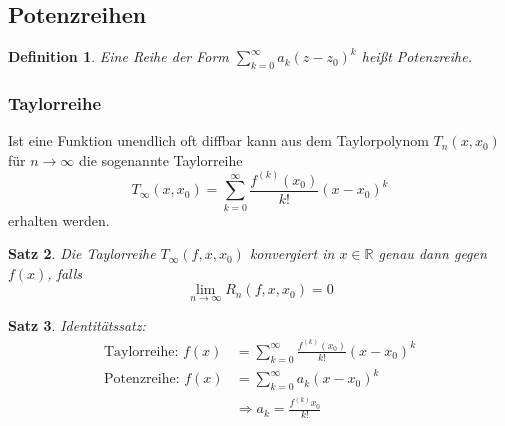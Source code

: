 \documentclass[12pt,a4paper]{article}%
\newtheorem{satz}{Satz}[section]
\newtheorem{definition}[satz]{Definition}
\numberwithin{equation}{section}
\newcommand{\R}{\mathbb{R}} %
\numberwithin{equation}{subsection}
\begin{document}
  \subsection{Potenzreihen}
  \begin{definition}
    Eine Reihe der Form $\sum\limits_{k = 0}^\infty a_k(z-z_0)^k$ heißt Potenzreihe.
  \end{definition}
	  \subsubsection{Taylorreihe}
	  Ist eine Funktion unendlich oft diffbar kann aus dem Taylorpolynom $T_n(x,x_0)$ für $n\rightarrow \infty$ die sogenannte Taylorreihe
	  \begin{equation}
	   T_\infty (x,x_0) = \sum\limits_{k = 0}^\infty \frac{f^{(k)}(x_0)}{k!}(x-x_0)^k
	  \end{equation}
	  erhalten werden.
	  \begin{satz}
	    Die Taylorreihe $T_\infty(f,x,x_0)$ konvergiert in $x \in \R$ genau dann gegen $f(x)$, falls
	    \begin{equation*}
	      \lim\limits_{n \rightarrow \infty} R_n(f,x,x_0) = 0
	    \end{equation*}
	  \end{satz}
	  \begin{satz}
	    Identitätssatz:
	    \begin{align}
	      \text{Taylorreihe: } f(x) &= \sum\limits_{k = 0}^\infty \frac{f^{(k)}(x_0)}{k!}(x-x_0)^k \nonumber \\
	      \text{Potenzreihe: } f(x) &= \sum\limits_{k = 0}^\infty a_k (x-x_0)^k \nonumber \\
	      &\Rightarrow a_k = \frac{f^{(k)}x_0}{k!}
	    \end{align}
	  \end{satz}
\end{document}
